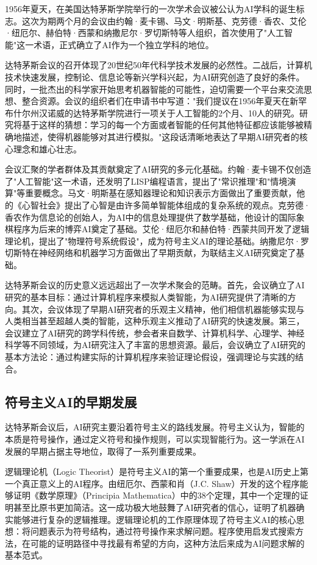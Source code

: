 1956年夏天，在美国达特茅斯学院举行的一次学术会议被公认为AI学科的诞生标志。这次为期两个月的会议由约翰·麦卡锡、马文·明斯基、克劳德·香农、艾伦·纽厄尔、赫伯特·西蒙和纳撒尼尔·罗切斯特等人组织，首次使用了"人工智能"这一术语，正式确立了AI作为一个独立学科的地位。

达特茅斯会议的召开体现了20世纪50年代科学技术发展的必然性。二战后，计算机技术快速发展，控制论、信息论等新兴学科兴起，为AI研究创造了良好的条件。同时，一批杰出的科学家开始思考机器智能的可能性，迫切需要一个平台来交流思想、整合资源。会议的组织者们在申请书中写道："我们提议在1956年夏天在新罕布什尔州汉诺威的达特茅斯学院进行一项关于人工智能的2个月、10人的研究。研究将基于这样的猜想：学习的每一个方面或者智能的任何其他特征都应该能够被精确地描述，使得机器能够对其进行模拟。"这段话清晰地表达了早期AI研究者的核心理念和雄心壮志。

会议汇聚的学者群体及其贡献奠定了AI研究的多元化基础。约翰·麦卡锡不仅创造了"人工智能"这一术语，还发明了LISP编程语言，提出了"常识推理"和"情境演算"等重要概念。马文·明斯基在感知器理论和知识表示方面做出了重要贡献，他的《心智社会》提出了心智是由许多简单智能体组成的复杂系统的观点。克劳德·香农作为信息论的创始人，为AI中的信息处理提供了数学基础，他设计的国际象棋程序为后来的博弈AI奠定了基础。艾伦·纽厄尔和赫伯特·西蒙共同开发了逻辑理论机，提出了"物理符号系统假设"，成为符号主义AI的理论基础。纳撒尼尔·罗切斯特在神经网络和机器学习方面做出了早期贡献，为联结主义AI研究奠定了基础。

达特茅斯会议的历史意义远远超出了一次学术聚会的范畴。首先，会议确立了AI研究的基本目标：通过计算机程序来模拟人类智能，为AI研究提供了清晰的方向。其次，会议体现了早期AI研究者的乐观主义精神，他们相信机器能够实现与人类相当甚至超越人类的智能，这种乐观主义推动了AI研究的快速发展。第三，会议建立了AI研究的跨学科传统，参会者来自数学、计算机科学、心理学、神经科学等不同领域，为AI研究注入了丰富的思想资源。最后，会议确立了AI研究的基本方法论：通过构建实际的计算机程序来验证理论假设，强调理论与实践的结合。

\subsection{符号主义AI的早期发展}

达特茅斯会议后，AI研究主要沿着符号主义的路线发展。符号主义认为，智能的本质是符号操作，通过定义符号和操作规则，可以实现智能行为。这一学派在AI发展的早期占据主导地位，取得了一系列重要成果。

逻辑理论机（Logic Theorist）是符号主义AI的第一个重要成果，也是AI历史上第一个真正意义上的AI程序。由纽厄尔、西蒙和肖（J.C. Shaw）开发的这个程序能够证明《数学原理》（Principia Mathematica）中的38个定理，其中一个定理的证明甚至比原书更加简洁。这一成功极大地鼓舞了AI研究者的信心，证明了机器确实能够进行复杂的逻辑推理。逻辑理论机的工作原理体现了符号主义AI的核心思想：将问题表示为符号结构，通过符号操作来求解问题。程序使用启发式搜索方法，在可能的证明路径中寻找最有希望的方向，这种方法后来成为AI问题求解的基本范式。

